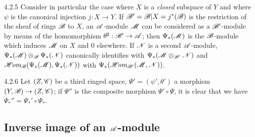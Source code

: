 \begin{env}{4.2.5}
\label{env-0.4.2.5}
Consider in particular the case where $X$ is a \emph{closed} subspace of $Y$ and where $\psi$
is the canonical injection $j:X\to Y$. If $\mathscr{B}'=\mathscr{B}|X=j^*(\mathscr{B})$ is the restriction
of the sheaf of rings $\mathscr{B}$ to $X$, an $\mathscr{A}$-module $\mathscr{M}$ can be considered as a
$\mathscr{B}'$-module by means of the homomorphism $\theta^\sharp:\mathscr{B}'\to\mathscr{A}$; then
$\Psi_*(\mathscr{M})$ is the $\mathscr{B}$-module which induces $\mathscr{M}$ on $X$ and $0$ elsewhere. If
$\mathscr{N}$ is a second $\mathscr{A}$-module, $\Psi_*(\mathscr{M})\otimes_\mathscr{B}\Psi_*(\mathscr{N})$
canonically identifies with $\Psi_*(\mathscr{M}\otimes_{\mathscr{B}'}\mathscr{N})$ and
$\mathscr{H}\!\textit{om}_\mathscr{B}(\Psi_*(\mathscr{M}),\Psi_*(\mathscr{N}))$ with
$\Psi_*(\mathscr{H}\!\textit{om}_{\mathscr{B}'}(\mathscr{M},\mathscr{N}))$.
\end{env}

\begin{env}{4.2.6}
\label{env-0.4.2.6}
Let $(Z,\mathscr{C})$ be a third ringed space, $\Psi'=(\psi',\theta')$ a morphism
$(Y,\mathscr{B})\to(Z,\mathscr{C})$; if $\Psi''$ is the composite morphism $\Psi'\circ\Psi$, it is
clear that we have $\Psi_*''=\Psi_*'\circ\Psi_*$.
\end{env}

\subsection{Inverse image of an $\mathscr{A}$-module}
\label{0-prelim-4.3}


